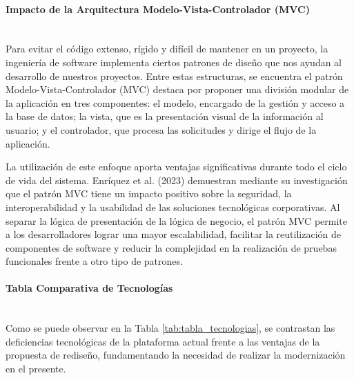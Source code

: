 \paragraph{Impacto de la Arquitectura Modelo-Vista-Controlador (MVC)} ~\\
\label{sec:impacto_mvc}Para evitar el código extenso, rígido y difícil de mantener en un proyecto, la ingeniería de software implementa ciertos patrones de diseño que nos ayudan al desarrollo de nuestros proyectos. Entre estas estructuras, se encuentra el patrón Modelo-Vista-Controlador (MVC) destaca por proponer una división modular de la aplicación en tres componentes: el modelo, encargado de la gestión y acceso a la base de datos; la vista, que es la presentación visual de la información al usuario; y el controlador, que procesa las solicitudes y dirige el flujo de la aplicación.

La utilización de este enfoque aporta ventajas significativas durante todo el ciclo de vida del sistema. Enríquez et al. (2023)\cite{enriquez2023impacto} demuestran mediante su investigación que el patrón MVC tiene un impacto positivo sobre la seguridad, la interoperabilidad y la usabilidad de las soluciones tecnológicas corporativas. Al separar la lógica de presentación de la lógica de negocio, el patrón MVC permite a los desarrolladores lograr una mayor escalabilidad, facilitar la reutilización de componentes de software y reducir la complejidad en la realización de pruebas funcionales frente a otro tipo de patrones.

\paragraph{Tabla Comparativa de Tecnologías} ~\\
\label{sec:tablacomparativa}Como se puede observar en la Tabla \ref{tab:tabla_tecnologias}, se contrastan las deficiencias tecnológicas de la plataforma actual frente a las ventajas de la propuesta de rediseño, fundamentando la necesidad de realizar la modernización en el presente.

